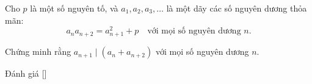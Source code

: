 \ifshowproblem
\begin{problem}\label{problem:THA-2015-MO-P1}
    Cho \( p \) là một số nguyên tố, và \( a_1, a_2, a_3, \ldots \) là một dãy các số nguyên dương thỏa mãn:
    \[
        a_n a_{n+2} = a_{n+1}^2 + p \quad \text{với mọi số nguyên dương } n.
    \]
    
    Chứng minh rằng \( a_{n+1} \mid (a_n + a_{n+2}) \) với mọi số nguyên dương \( n \).
\end{problem}
\fi

\ifshowinfo
Đánh giá [\textbf{}]\footnotemark
{}
\fi